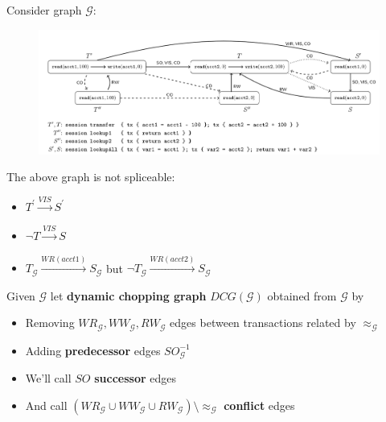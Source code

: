 \documentclass{beamer}
\begin{document}
\begin{frame}
	Consider graph $\mathcal{G}$:
	\begin{figure}
		\includegraphics[scale=0.28]{fig4}
	\end{figure}
	\begin{example}
		The above graph is not spliceable:
		\begin{itemize}
			\item $T^\prime \xrightarrow{VIS} S^\prime$
			\item $\neg T \xrightarrow{VIS} S$
			\item $\boxed{T}_\mathcal{G} \xrightarrow{WR(acct1)} \boxed{S}_\mathcal{G}$ but $\neg \boxed{T}_\mathcal{G} \xrightarrow{WR(acct2)} \boxed{S}_\mathcal{G}$
		\end{itemize}
	\end{example}
\end{frame}

\begin{frame}
	\begin{definition}
		Given $\mathcal{G}$ let \textbf{dynamic chopping graph} $DCG(\mathcal{G})$ obtained from $\mathcal{G}$ by
		\begin{itemize}
			\item Removing $WR_\mathcal{G}, WW_\mathcal{G}, RW_\mathcal{G}$ edges between transactions related by $\approx_\mathcal{G}$
			\item Adding \textbf{predecessor} edges $SO^{-1}_\mathcal{G}$
			\item We'll call $SO$ \textbf{successor} edges
			\item And  call $\left( WR_\mathcal{G} \cup WW_\mathcal{G} \cup RW_\mathcal{G} \right) \setminus \approx_\mathcal{G}$ \textbf{conflict} edges
		\end{itemize}
	\end{definition}
\end{frame}
\end{document}
